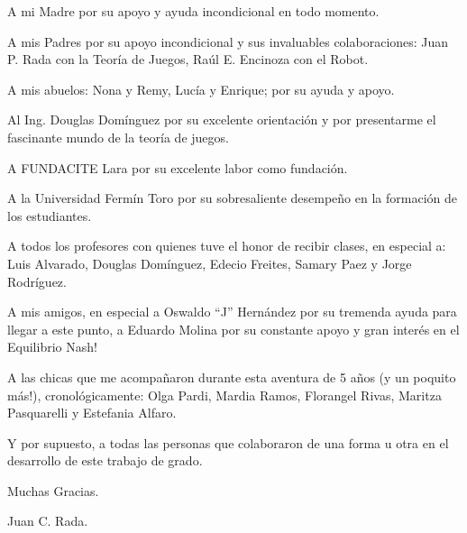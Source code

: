 A mi Madre por su apoyo y ayuda incondicional en todo momento.\par
 A mis Padres por su apoyo incondicional y sus invaluables colaboraciones: Juan P. Rada con la Teoría de Juegos, Raúl E. Encinoza con el Robot. \par
 A mis abuelos: Nona y Remy, Lucía y Enrique; por su ayuda y apoyo. \par
 Al Ing. Douglas Domínguez por su excelente orientación y por presentarme el fascinante mundo de la teoría de juegos. \par
 A FUNDACITE Lara por su excelente labor como fundación. \par
 A la Universidad Fermín Toro por su sobresaliente desempeño en la formación de los estudiantes. \par
 A todos los profesores con quienes tuve el honor de recibir clases, en especial a: Luis Alvarado, Douglas Domínguez, Edecio Freites, Samary Paez y Jorge Rodríguez. \par
 A mis amigos, en especial a Oswaldo “J” Hernández por su tremenda ayuda para llegar a este punto, a Eduardo Molina por su constante apoyo y gran interés en el Equilibrio Nash! \par
 A las chicas que me acompañaron durante esta aventura de 5 años (y un poquito más!), cronológicamente: Olga Pardi, Mardia Ramos, Florangel Rivas, Maritza Pasquarelli y Estefania Alfaro. \par
 Y por supuesto, a todas las personas que colaboraron de una forma u otra en el 
desarrollo de este trabajo de grado. \par
Muchas Gracias. \par
Juan C. Rada. \par